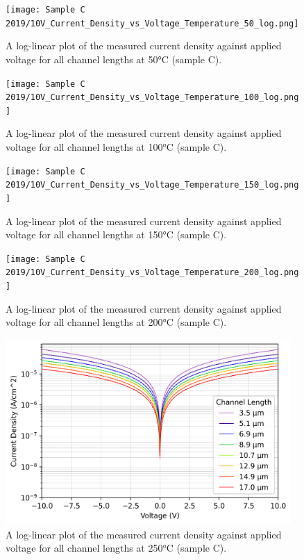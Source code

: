 \begin{figure}[h]
    \centering
    \texttt{[image: Sample C 2019/10V\_Current\_Density\_vs\_Voltage\_Temperature\_50\_log.png]}
    \caption{A log-linear plot of the measured current density against applied voltage for all channel lengths at 50\si{\degreeCelsius} (sample C).}
    \label{appfig:current_density_50}
\end{figure}
\begin{figure}[h]
    \centering
    \texttt{[image: Sample C 2019/10V\_Current\_Density\_vs\_Voltage\_Temperature\_100\_log.png]}
    \caption{A log-linear plot of the measured current density against applied voltage for all channel lengths at 100\si{\degreeCelsius} (sample C).}
    \label{appfig:current_density_100}
\end{figure}
\begin{figure}[h]
    \centering
    \texttt{[image: Sample C 2019/10V\_Current\_Density\_vs\_Voltage\_Temperature\_150\_log.png]}
    \caption{A log-linear plot of the measured current density against applied voltage for all channel lengths at 150\si{\degreeCelsius} (sample C).}
    \label{appfig:current_density_150}
\end{figure}
\begin{figure}[h]
    \centering
    \texttt{[image: Sample C 2019/10V\_Current\_Density\_vs\_Voltage\_Temperature\_200\_log.png]}
    \caption{A log-linear plot of the measured current density against applied voltage for all channel lengths at 200\si{\degreeCelsius} (sample C).}
    \label{appfig:current_density_200}
\end{figure}
\begin{figure}[h]
    \centering
    \includegraphics[width=0.97\textwidth]{Chapter6/Figs/Raster/Sample C 2019/10V_Current_Density_vs_Voltage_Temperature_250_log.png}
    \caption{A log-linear plot of the measured current density against applied voltage for all channel lengths at 250\si{\degreeCelsius} (sample C).}
    \label{appfig:current_density_250}
\end{figure}
